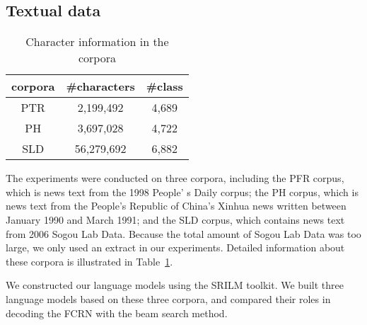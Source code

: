 \documentclass[10pt,conference,a4paper]{IEEEtran}
\begin{document}
\subsection{Textual data}
\begin{table}[b]
\caption{Character information in the corpora}
\label{TableCorpora}
\centering
\begin{tabular}{c|cc}
\hline
corpora&\#characters&\#class\\
\hline
PTR&2,199,492 &4,689\\
PH&3,697,028&4,722\\
SLD&56,279,692&6,882\\
\hline
\end{tabular}
\end{table}
The experiments were conducted on three corpora,
including the PFR corpus\cite{PFR}, which is news text from the 1998 People' s Daily corpus;
the PH\cite{PH} corpus, which is news text from the People's Republic of China's Xinhua news written between January 1990 and March 1991;
and the SLD corpus\cite{SG}, which contains news text from 2006 Sogou Lab Data.
Because the total amount of Sogou Lab Data was too large, we only used an extract in our experiments.
Detailed information about these corpora is illustrated in Table~\ref{TableCorpora}.


We constructed our language models using the SRILM toolkit\cite{stolcke2002srilm}. We built three language models based on these three corpora, and compared their roles in decoding the FCRN with the beam search method.
\end{document}
